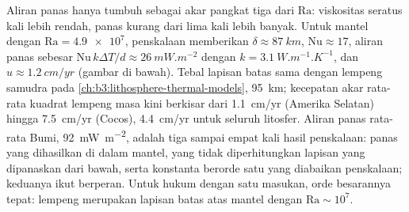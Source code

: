 Aliran panas hanya tumbuh sebagai akar pangkat tiga dari $\mathrm{Ra}$: viskositas seratus kali
lebih rendah, panas kurang dari lima kali lebih banyak. Untuk mantel dengan
$\mathrm{Ra} = \num{4.9e7}$, penskalaan memberikan $\delta \approx \qty{87}{km}$,
$\mathrm{Nu} \approx 17$, aliran panas sebesar $\mathrm{Nu}\,k\Delta T/d \approx
\qty{26}{mW.m^{-2}}$ dengan $k = \qty{3.1}{W.m^{-1}.K^{-1}}$, dan $u \approx
\qty{1.2}{cm/yr}$ (gambar di bawah). Tebal lapisan batas sama dengan
lempeng samudra pada \cref{ch:b3:lithosphere-thermal-models}, \qty{95}{km}; kecepatan
akar rata-rata kuadrat lempeng masa kini berkisar dari \qty{1.1}{cm/yr} (Amerika
Selatan) hingga \qty{7.5}{cm/yr} (Cocos), \qty{4.4}{cm/yr} untuk seluruh
litosfer. Aliran panas rata-rata Bumi, \qty{92}{mW.m^{-2}}, adalah tiga sampai empat
kali hasil penskalaan: panas yang dihasilkan di dalam mantel, yang tidak
diperhitungkan lapisan yang dipanaskan dari bawah, serta konstanta berorde satu yang
diabaikan penskalaan; keduanya ikut berperan. Untuk hukum dengan satu masukan, orde besarannya
tepat: lempeng merupakan lapisan batas atas mantel dengan $\mathrm{Ra}
\sim 10^7$.

